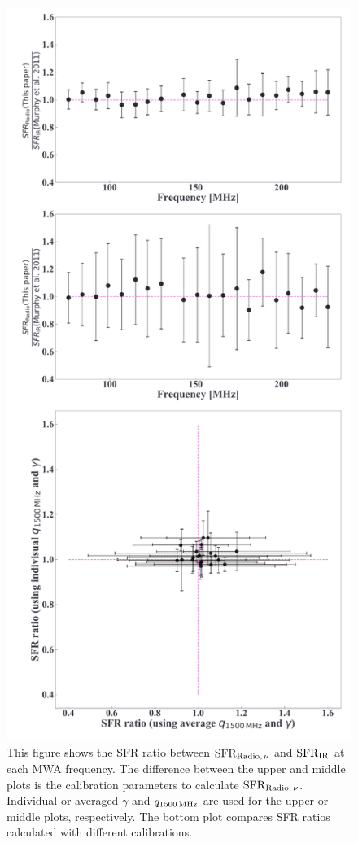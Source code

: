 \begin{figure}[htbp]
	\centering
	\includegraphics[width=.6\linewidth]{Chapter_5/Figures/Result_sfrratio.pdf}
    \caption[The consistency of the radio SFR]{\label{fig:sfrratio}
        This figure shows the SFR ratio between $\mathrm{SFR}_{\mathrm{Radio},\,\nu}$ and $\mathrm{SFR}_{\mathrm{IR}}$ at each MWA frequency.
        The difference between the upper and middle plots is the calibration parameters to calculate $\mathrm{SFR}_{\mathrm{Radio},\,\nu}$.
        Individual or averaged $\gamma$ and $q_{\mathrm{1500\,\mathrm{MHz}}}$ are used for the upper or middle plots, respectively.
    The bottom plot compares SFR ratios calculated with different calibrations.
    }
\end{figure}

